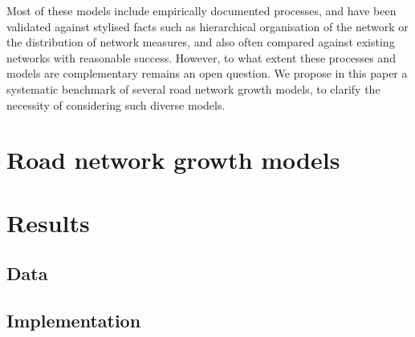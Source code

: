 \documentclass{article}
\begin{document}
Most of these models include empirically documented processes, and have been validated against stylised facts such as hierarchical organisation of the network or the distribution of network measures, and also often compared against existing networks with reasonable success. However, to what extent these processes and models are complementary remains an open question. We propose in this paper a systematic benchmark of several road network growth models, to clarify the necessity of considering such diverse models. 




\section{Road network growth models}


 
 \cite{raimbault2020unveiling}
 \cite{raimbault2019second}
 \cite{louf2013emergence}
 \cite{raimbault2018systemes}
  
 
  
  
\section{Results}
 
\subsection{Data}
  
  
 \subsection{Implementation} 
  
  
\end{document}
